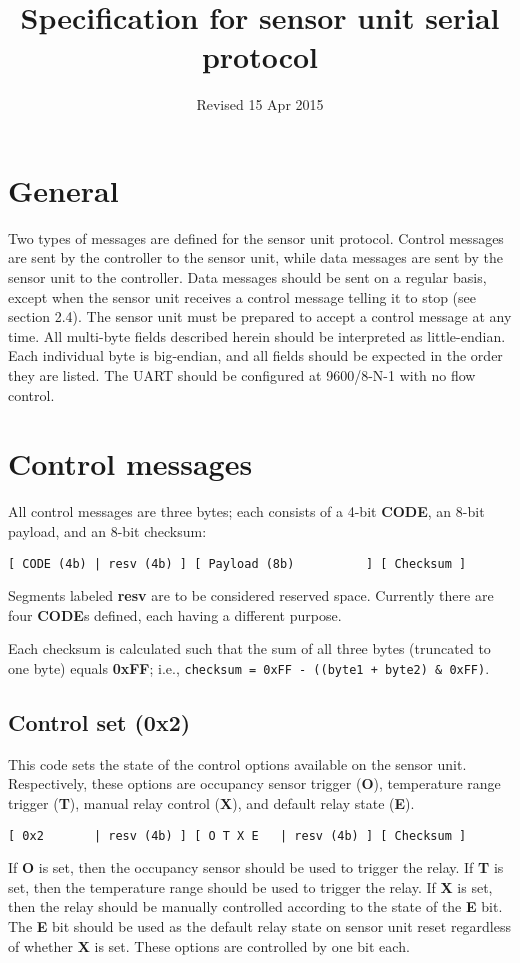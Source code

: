 \documentclass[11pt]{article}
\title{\textbf{Specification for sensor unit serial protocol}}
\date{\vspace{-24pt} Revised 15 Apr 2015}
\begin{document}
\maketitle

\parskip   0pt

\section{General}
Two types of messages are defined for the sensor unit protocol. Control messages are sent by the controller to the sensor unit, while data messages are sent by the sensor unit to the controller. Data messages should be sent on a regular basis, except when the sensor unit receives a control message telling it to stop (see section 2.4). The sensor unit must be prepared to accept a control message at any time. All multi-byte fields described herein should be interpreted as little-endian. Each individual byte is big-endian, and all fields should be expected in the order they are listed. The UART should be configured at 9600/8-N-1 with no flow control.

\section{Control messages}
All control messages are three bytes; each consists of a 4-bit \textbf{CODE}, an 8-bit payload, and an 8-bit checksum:
\begin{verbatim}
[ CODE (4b) | resv (4b) ] [ Payload (8b)          ] [ Checksum ]
\end{verbatim}
Segments labeled \textbf{resv} are to be considered reserved space. Currently there are four \textbf{CODE}s defined, each having a different purpose.

Each checksum is calculated such that the sum of all three bytes (truncated to one byte) equals \textbf{0xFF}; i.e., \texttt{checksum = 0xFF - ((byte1 + byte2) \& 0xFF)}.

\subsection{Control set (0x2)}
This code sets the state of the control options available on the sensor unit. Respectively, these options are occupancy sensor trigger (\textbf{O}), temperature range trigger (\textbf{T}), manual relay control (\textbf{X}), and default relay state (\textbf{E}).
\begin{verbatim}
[ 0x2       | resv (4b) ] [ O T X E   | resv (4b) ] [ Checksum ]
\end{verbatim}
If \textbf{O} is set, then the occupancy sensor should be used to trigger the relay. If \textbf{T} is set, then the temperature range should be used to trigger the relay. If \textbf{X} is set, then the relay should be manually controlled according to the state of the \textbf{E} bit. The \textbf{E} bit should be used as the default relay state on sensor unit reset regardless of whether \textbf{X} is set. These options are controlled by one bit each.
\end{document}

